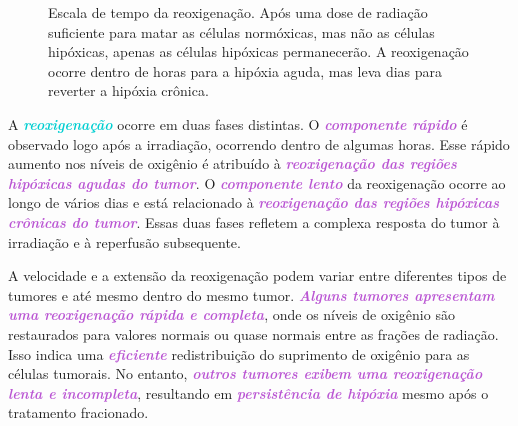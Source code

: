 \documentclass[11pt,a4paper]{article}
\begin{document}
	\begin{figure}[h]
		\centering
		\caption{Escala de tempo da reoxigenação. Após uma dose de radiação suficiente para matar as células normóxicas, mas não as células hipóxicas, apenas as células hipóxicas permanecerão. A reoxigenação ocorre dentro de horas para a hipóxia aguda, mas leva dias para reverter a hipóxia crônica.}
		\label{fig:reoxigenacaoAposIrradiacao}
	\end{figure}

	A \textcolor{DarkTurquoise}{\textbf{\textit{reoxigenação}}} ocorre em duas fases distintas. O \textcolor{MediumOrchid}{\textbf{\textit{componente rápido}}} é observado logo após a irradiação, ocorrendo dentro de algumas horas. Esse rápido aumento nos níveis de oxigênio é atribuído à \textcolor{MediumOrchid}{\textbf{\textit{reoxigenação das regiões hipóxicas agudas do tumor}}}. O \textcolor{MediumOrchid}{\textbf{\textit{componente lento}}} da reoxigenação ocorre ao longo de vários dias e está relacionado à \textcolor{MediumOrchid}{\textbf{\textit{reoxigenação das regiões hipóxicas crônicas do tumor}}}. Essas duas fases refletem a complexa resposta do tumor à irradiação e à reperfusão subsequente.

	A velocidade e a extensão da reoxigenação podem variar entre diferentes tipos de tumores e até mesmo dentro do mesmo tumor. \textcolor{MediumOrchid}{\textbf{\textit{Alguns tumores apresentam uma reoxigenação rápida e completa}}}, onde os níveis de oxigênio são restaurados para valores normais ou quase normais entre as frações de radiação. Isso indica uma \textcolor{MediumOrchid}{\textbf{\textit{eficiente}}} redistribuição do suprimento de oxigênio para as células tumorais. No entanto, \textcolor{MediumOrchid}{\textbf{\textit{outros tumores exibem uma reoxigenação lenta e incompleta}}}, resultando em \textcolor{MediumOrchid}{\textbf{\textit{persistência de hipóxia}}} mesmo após o tratamento fracionado.
\end{document}
